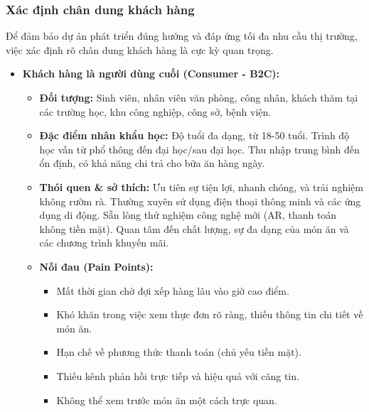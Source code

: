 \documentclass[12pt,a4paper]{article}
\begin{document}
\subsubsection{Xác định chân dung khách hàng}
Để đảm bảo dự án phát triển đúng hướng và đáp ứng tối đa nhu cầu thị trường, việc xác định rõ chân dung khách hàng là cực kỳ quan trọng.
\begin{itemize}[label=\textbullet]
    \item \textbf{Khách hàng là người dùng cuối (Consumer - B2C):}
    \begin{itemize}[label=\textendash]
        \item \textbf{Đối tượng:} Sinh viên, nhân viên văn phòng, công nhân, khách thăm tại các trường học, khu công nghiệp, công sở, bệnh viện.
        \item \textbf{Đặc điểm nhân khẩu học:} Độ tuổi đa dạng, từ 18-50 tuổi. Trình độ học vấn từ phổ thông đến đại học/sau đại học. Thu nhập trung bình đến ổn định, có khả năng chi trả cho bữa ăn hàng ngày.
        \item \textbf{Thói quen \& sở thích:} Ưu tiên sự tiện lợi, nhanh chóng, và trải nghiệm không rườm rà. Thường xuyên sử dụng điện thoại thông minh và các ứng dụng di động. Sẵn lòng thử nghiệm công nghệ mới (AR, thanh toán không tiền mặt). Quan tâm đến chất lượng, sự đa dạng của món ăn và các chương trình khuyến mãi.
        \item \textbf{Nỗi đau (Pain Points):}
        \begin{itemize}[label=\textrightarrow]
            \item Mất thời gian chờ đợi xếp hàng lâu vào giờ cao điểm.
            \item Khó khăn trong việc xem thực đơn rõ ràng, thiếu thông tin chi tiết về món ăn.
            \item Hạn chế về phương thức thanh toán (chủ yếu tiền mặt).
            \item Thiếu kênh phản hồi trực tiếp và hiệu quả với căng tin.
            \item Không thể xem trước món ăn một cách trực quan.
        \end{itemize}
    \end{itemize}


\end{itemize}
\end{document}
